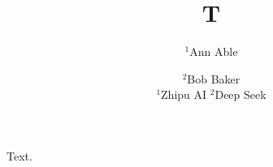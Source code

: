 \documentclass{article}
\begin{document}
\title{T}
\author{$^1$Ann Able \and $^2$Bob Baker\\
$^1$Zhipu AI \quad $^2$Deep Seek}
\maketitle
Text.
\end{document}
